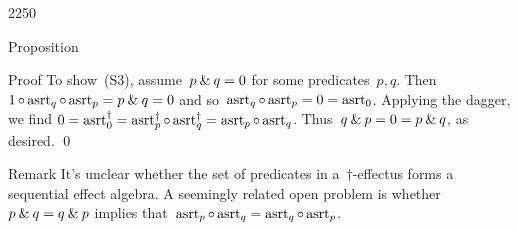 \begin{parsec}{2250}
\begin{point}{60}{Proposition}
\begin{point}{70}{Proof}
To show~(S3), assume~$p \mathbin{\&} q = 0$
    for some predicates~$p,q$.
    Then~$1 \mathop{\circ} \mathrm{asrt}_q \mathop{\circ} \mathrm{asrt}_p  = p \mathbin{\&} q= 0$
and so~$\mathrm{asrt}_q \mathop{\circ} \mathrm{asrt}_p = 0 = \mathrm{asrt}_0$.
Applying the dagger, we find
$0 = \mathrm{asrt}_0^\dagger = \mathrm{asrt}_p^\dagger \mathop{\circ} \mathrm{asrt}_q^\dagger
                = \mathrm{asrt}_p \mathop{\circ} \mathrm{asrt}_q$.
    Thus~$q \mathbin{\&} p = 0 = p \mathbin{\&} q$, as desired. \qed
\end{point}
\begin{point}{80}{Remark}%
It's unclear whether the set of predicates in a~$\dagger$-effectus
    forms a sequential effect algebra.
A seemingly related open problem
    is whether~$p \mathbin{\&} q = q \mathbin{\&} p$
    implies that~$\mathrm{asrt}_p \mathop{\circ} \mathrm{asrt}_q = \mathrm{asrt}_q \mathop{\circ} \mathrm{asrt}_p$.
\end{point}
\end{point}
\end{parsec}

